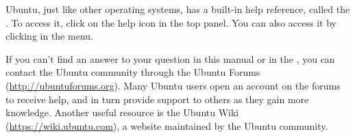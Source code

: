 Ubuntu, just like other operating systems, has a built-in help reference, called the . To access it, click on the help icon in the top panel. You can also access it by clicking  in the  menu.



If you can't find an answer to your question in this manual or in the , you can contact the Ubuntu community through the Ubuntu Forums (\url{http://ubuntuforums.org}).  Many Ubuntu users open an account on the forums to receive help, and in turn provide support to others as they gain more knowledge. Another useful resource is the Ubuntu Wiki (\url{https://wiki.ubuntu.com}), a website maintained by the Ubuntu community.

